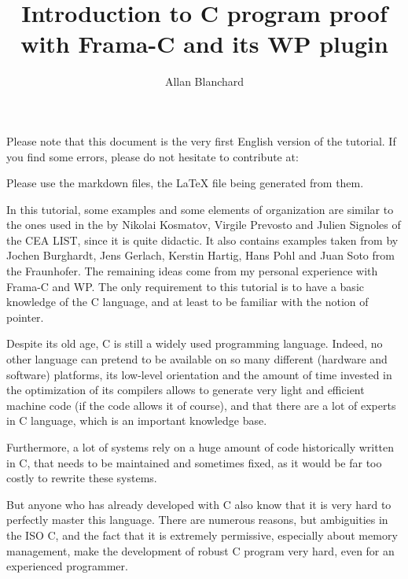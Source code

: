 \documentclass[middle]{zmdocument}
\title{Introduction to C program proof with Frama-C and its WP plugin}
\author{Allan Blanchard}
\begin{document}
\maketitle
\tableofcontents


\begin{Warning}
  Please note that this document is the very first English version of the
  tutorial. If you find some errors, please do not hesitate to contribute at:


  Please use the markdown files, the LaTeX file being generated from them.
\end{Warning}


\begin{Information}
  In this tutorial, some examples and some elements of organization are
  similar to the ones used in the 
  by Nikolai Kosmatov, Virgile Prevosto and Julien
  Signoles of the CEA LIST, since it is quite didactic. It also
  contains examples taken from
  \textit{}
  by Jochen Burghardt, Jens Gerlach, Kerstin Hartig, Hans Pohl and Juan
  Soto from the Fraunhofer. The remaining ideas come from my personal
  experience with Frama-C and WP. The only requirement to this tutorial
  is to have a basic knowledge of the C language, and at least to
  be familiar with the notion of pointer.
\end{Information}


Despite its old age, C is still a widely used programming language.
Indeed, no other language can pretend to be available on so many
different (hardware and software) platforms, its low-level orientation
and the amount of time invested in the optimization of its compilers
allows to generate very light and efficient machine code (if the code
allows it of course), and that there are a lot of experts in C language,
which is an important knowledge base.


Furthermore, a lot of systems rely on a huge amount of code historically
written in C, that needs to be maintained and sometimes fixed, as it
would be far too costly to rewrite these systems.


But anyone who has already developed with C also know that it is very
hard to perfectly master this language. There are numerous reasons, but
ambiguities in the ISO C, and the fact that it is extremely permissive,
especially about memory management, make the development of robust C
program very hard, even for an experienced programmer.
\end{document}
